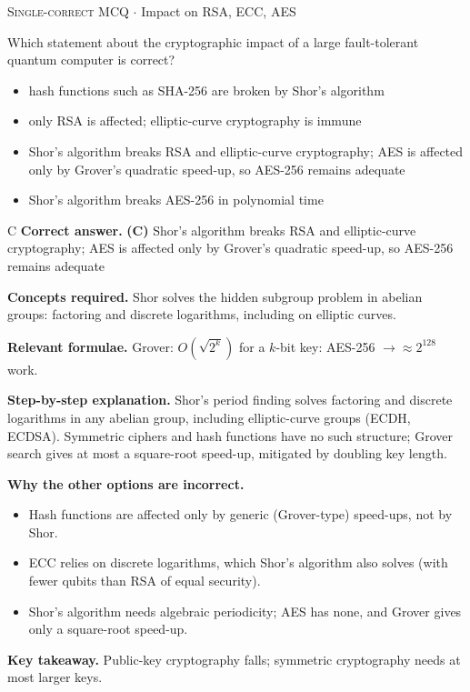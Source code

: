 \documentclass[11pt,a4paper]{article}
\newcommand{\optlabel}[1]{\textbf{(#1)}}
\newcommand{\correctlabel}[1]{\textcolor{okgreen}{\textbf{(#1)}\,\ding{51}}}
\newenvironment{qitem}[1]{\begin{list}{}{\setlength{\leftmargin}{3.3em}\setlength{\labelwidth}{3.1em}%
  \setlength{\labelsep}{0.2em}\setlength{\topsep}{3pt}\setlength{\parsep}{3pt}}\item[\textbf{Q.#1}\hfill]}{\end{list}}
\newcommand{\qsep}{\par\vspace{2pt}{\color{black!15}\hrule}\vspace{4pt}}
\newcommand{\qmeta}[2]{{\footnotesize\color{black!60}\textsc{#1} \;$\cdot$\; #2}\par}
\begin{document}
\begin{qitem}{74}
\qmeta{Single-correct MCQ}{Impact on RSA, ECC, AES}
Which statement about the cryptographic impact of a large fault-tolerant quantum computer is correct?
\begin{itemize}[leftmargin=2.6em, labelsep=0.4em, itemsep=2pt, topsep=3pt]
\item[\optlabel{A}] hash functions such as SHA-256 are broken by Shor's algorithm
\item[\optlabel{B}] only RSA is affected; elliptic-curve cryptography is immune
\item[\correctlabel{C}] Shor's algorithm breaks RSA and elliptic-curve cryptography; AES is affected only by Grover's quadratic speed-up, so AES-256 remains adequate
\item[\optlabel{D}] Shor's algorithm breaks AES-256 in polynomial time
\end{itemize}
\end{qitem}
\begin{solbox}{C}
\textbf{\color{brand}Correct answer.} \textcolor{okgreen}{\textbf{(C)}} Shor's algorithm breaks RSA and elliptic-curve cryptography; AES is affected only by Grover's quadratic speed-up, so AES-256 remains adequate

\textbf{\color{brand}Concepts required.} Shor solves the hidden subgroup problem in abelian groups: factoring and discrete logarithms, including on elliptic curves.

\textbf{\color{brand}Relevant formulae.} Grover: $O(\sqrt{2^k})$ for a $k$-bit key: AES-256 $\to \approx2^{128}$ work.

\textbf{\color{brand}Step-by-step explanation.} Shor's period finding solves factoring and discrete logarithms in any abelian group, including elliptic-curve groups (ECDH, ECDSA). Symmetric ciphers and hash
functions have no such structure; Grover search gives at most a square-root speed-up, mitigated by doubling key length.

\textbf{\color{brand}Why the other options are incorrect.}
\begin{itemize}[leftmargin=2.4em, itemsep=1pt, topsep=2pt]
\item[\textbf{(A)}] Hash functions are affected only by generic (Grover-type) speed-ups, not by Shor.
\item[\textbf{(B)}] ECC relies on discrete logarithms, which Shor's algorithm also solves (with fewer qubits than RSA of equal security).
\item[\textbf{(D)}] Shor's algorithm needs algebraic periodicity; AES has none, and Grover gives only a square-root speed-up.
\end{itemize}
\textbf{\color{brand}Key takeaway.} Public-key cryptography falls; symmetric cryptography needs at most larger keys.
\end{solbox}
\qsep
\end{document}
